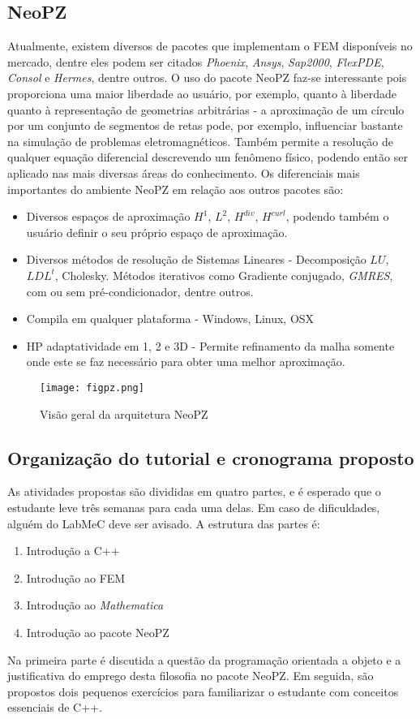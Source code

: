 \documentclass[11pt, oneside]{article}   	%
\begin{document}
\subsection{NeoPZ}
Atualmente, existem diversos de pacotes que implementam o FEM disponíveis no mercado, dentre eles podem ser citados \emph{Phoenix}, \emph{Ansys}, \emph{Sap2000}, \emph{FlexPDE}, \emph{Consol} e \emph{Hermes}, dentre outros. O uso do pacote NeoPZ faz-se interessante pois proporciona uma maior liberdade ao usuário, por exemplo, quanto à liberdade quanto à representação de geometrias arbitrárias - a aproximação de um círculo por um conjunto de segmentos de retas pode, por exemplo, influenciar bastante na simulação de problemas eletromagnéticos. Também permite a resolução de qualquer equação diferencial descrevendo um fenômeno físico, podendo então ser aplicado nas mais diversas áreas do conhecimento. Os diferenciais mais importantes do ambiente NeoPZ em relação aos outros pacotes são:
\begin{itemize}
\item Diversos espaços de aproximação  $H^{1}$, $L^{2}$, $H^{div}$, $H^{curl}$, podendo também o usuário definir o seu próprio espaço de aproximação.
\item Diversos métodos de resolução de Sistemas Lineares - Decomposição $LU$, $LDL^{t}$, Cholesky. Métodos iterativos como Gradiente conjugado, \emph{GMRES}, com ou sem pré-condicionador, dentre outros.
\item Compila em qualquer plataforma - Windows, Linux, OSX
\item HP adaptatividade em 1, 2 e 3D - Permite refinamento da malha somente onde este se faz necessário para obter uma melhor aproximação.
\end{itemize}

\begin{figure}[h!]
  \centering
      \texttt{[image: figpz.png]}
  \caption{Visão geral da arquitetura NeoPZ}
\end{figure}
\FloatBarrier
\subsection{Organização do tutorial e cronograma proposto}
As atividades propostas são divididas em quatro partes, e é esperado que o estudante leve três semanas para cada uma delas. Em caso de dificuldades, alguém do LabMeC deve ser avisado. A estrutura das partes é:
\begin{enumerate}
  \item Introdução a C++
  \item Introdução ao FEM
  \item Introdução ao \emph{Mathematica}
  \item Introdução ao pacote NeoPZ
\end{enumerate}
Na primeira parte é discutida a questão da programação orientada a objeto e a justificativa do emprego desta filosofia no pacote NeoPZ. Em seguida, são propostos dois pequenos exercícios para familiarizar o estudante com conceitos essenciais de C++.
\end{document}
